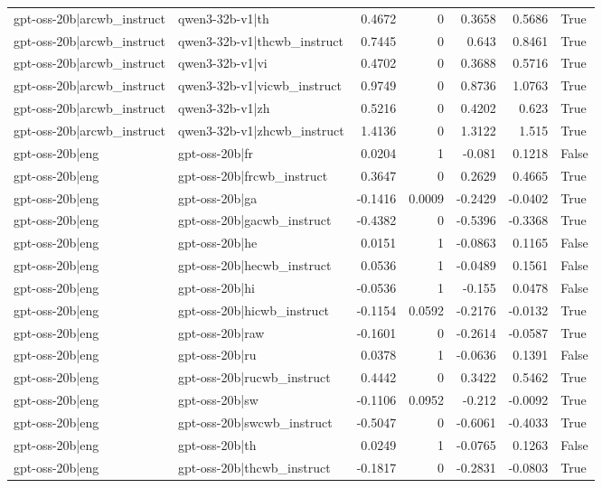 \begin{table}
\begin{tabular}{l l r r r r l}
gpt-oss-20b|arcwb_instruct & qwen3-32b-v1|th & 0.4672 & 0 & 0.3658 & 0.5686 & True \\
gpt-oss-20b|arcwb_instruct & qwen3-32b-v1|thcwb_instruct & 0.7445 & 0 & 0.643 & 0.8461 & True \\
gpt-oss-20b|arcwb_instruct & qwen3-32b-v1|vi & 0.4702 & 0 & 0.3688 & 0.5716 & True \\
gpt-oss-20b|arcwb_instruct & qwen3-32b-v1|vicwb_instruct & 0.9749 & 0 & 0.8736 & 1.0763 & True \\
gpt-oss-20b|arcwb_instruct & qwen3-32b-v1|zh & 0.5216 & 0 & 0.4202 & 0.623 & True \\
gpt-oss-20b|arcwb_instruct & qwen3-32b-v1|zhcwb_instruct & 1.4136 & 0 & 1.3122 & 1.515 & True \\
gpt-oss-20b|eng & gpt-oss-20b|fr & 0.0204 & 1 & -0.081 & 0.1218 & False \\
gpt-oss-20b|eng & gpt-oss-20b|frcwb_instruct & 0.3647 & 0 & 0.2629 & 0.4665 & True \\
gpt-oss-20b|eng & gpt-oss-20b|ga & -0.1416 & 0.0009 & -0.2429 & -0.0402 & True \\
gpt-oss-20b|eng & gpt-oss-20b|gacwb_instruct & -0.4382 & 0 & -0.5396 & -0.3368 & True \\
gpt-oss-20b|eng & gpt-oss-20b|he & 0.0151 & 1 & -0.0863 & 0.1165 & False \\
gpt-oss-20b|eng & gpt-oss-20b|hecwb_instruct & 0.0536 & 1 & -0.0489 & 0.1561 & False \\
gpt-oss-20b|eng & gpt-oss-20b|hi & -0.0536 & 1 & -0.155 & 0.0478 & False \\
gpt-oss-20b|eng & gpt-oss-20b|hicwb_instruct & -0.1154 & 0.0592 & -0.2176 & -0.0132 & True \\
gpt-oss-20b|eng & gpt-oss-20b|raw & -0.1601 & 0 & -0.2614 & -0.0587 & True \\
gpt-oss-20b|eng & gpt-oss-20b|ru & 0.0378 & 1 & -0.0636 & 0.1391 & False \\
gpt-oss-20b|eng & gpt-oss-20b|rucwb_instruct & 0.4442 & 0 & 0.3422 & 0.5462 & True \\
gpt-oss-20b|eng & gpt-oss-20b|sw & -0.1106 & 0.0952 & -0.212 & -0.0092 & True \\
gpt-oss-20b|eng & gpt-oss-20b|swcwb_instruct & -0.5047 & 0 & -0.6061 & -0.4033 & True \\
gpt-oss-20b|eng & gpt-oss-20b|th & 0.0249 & 1 & -0.0765 & 0.1263 & False \\
gpt-oss-20b|eng & gpt-oss-20b|thcwb_instruct & -0.1817 & 0 & -0.2831 & -0.0803 & True \\

\end{tabular}
\end{table}
